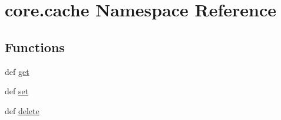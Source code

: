 \hypertarget{namespacecore_1_1cache}{\section{core.\-cache Namespace Reference}
\label{namespacecore_1_1cache}
}
\subsection*{Functions}
\begin{DoxyCompactItemize}
\item 
def \hyperlink{namespacecore_1_1cache_a73148718d680bc7696b045ad470bb5fa}{get}
\item 
def \hyperlink{namespacecore_1_1cache_a37a6e988437488f2c18a711df682b1d5}{set}
\item 
def \hyperlink{namespacecore_1_1cache_ac5ae1739a3d10242b24228b9e13ea2a7}{delete}
\end{DoxyCompactItemize}


